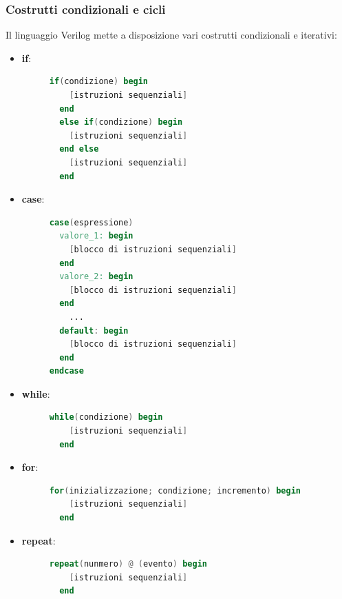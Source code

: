 \documentclass[a4paper]{article}
\theoremstyle{break}
\theoremstyle{break}
\theoremstyle{break}
\theoremstyle{break}
\begin{document}
\subsubsection{Costrutti condizionali e cicli}
Il linguaggio Verilog mette a disposizione vari costrutti condizionali e iterativi:
\begin{itemize}
  \item \textbf{if}:
    \begin{figure}[H]
      \begin{lstlisting}[language=Verilog]
  if(condizione) begin
    [istruzioni sequenziali]
  end
  else if(condizione) begin
    [istruzioni sequenziali]
  end else
    [istruzioni sequenziali]
  end
      \end{lstlisting}
    \end{figure}
  \item \textbf{case}:
        \begin{figure}[H]
      \begin{lstlisting}[language=Verilog]
case(espressione)
  valore_1: begin
    [blocco di istruzioni sequenziali]
  end
  valore_2: begin
    [blocco di istruzioni sequenziali]
  end
    ...
  default: begin
    [blocco di istruzioni sequenziali]
  end
endcase
      \end{lstlisting}
    \end{figure}
  \item \textbf{while}:
    \begin{figure}[H]
      \begin{lstlisting}[language=Verilog]
  while(condizione) begin
    [istruzioni sequenziali]
  end
      \end{lstlisting}
    \end{figure}
  \item \textbf{for}:
    \begin{figure}[H]
      \begin{lstlisting}[language=Verilog]
  for(inizializzazione; condizione; incremento) begin
    [istruzioni sequenziali]
  end
      \end{lstlisting}
    \end{figure}
  \item \textbf{repeat}:
    \begin{figure}[H]
      \begin{lstlisting}[language=Verilog]
  repeat(nunmero) @ (evento) begin
    [istruzioni sequenziali]
  end
      \end{lstlisting}
    \end{figure} 
\end{itemize}
\end{document}
